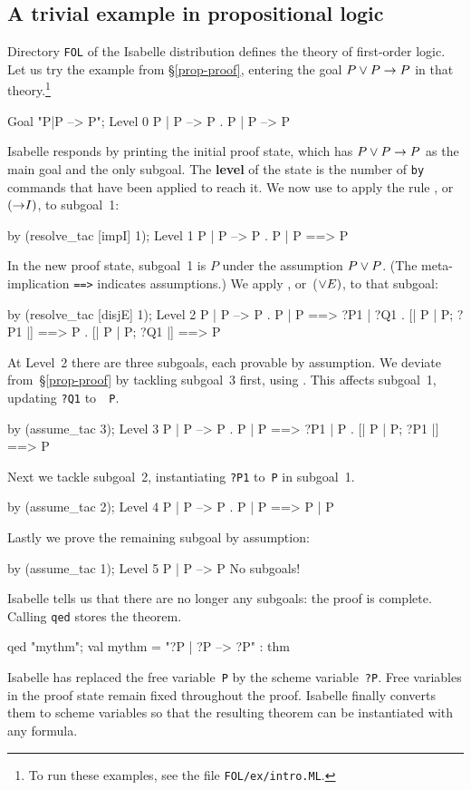 \subsection{A trivial example in propositional logic}

Directory \texttt{FOL} of the Isabelle distribution defines the theory of
first-order logic.  Let us try the example from \S\ref{prop-proof},
entering the goal $P\vee P\rightarrow P$ in that theory.\footnote{To run these
  examples, see the file \texttt{FOL/ex/intro.ML}.}
\begin{ttbox}
Goal "P|P --> P"; 
{\out Level 0} 
{\out P | P --> P} 
{. P | P --> P} 
\end{ttbox}
Isabelle responds by printing the initial proof state, which has $P\vee
P\rightarrow P$ as the main goal and the only subgoal.  The {\bf level} of the
state is the number of \texttt{by} commands that have been applied to reach
it.  We now use  to apply the rule ,
or~$({\rightarrow}I)$, to subgoal~1:
\begin{ttbox}
by (resolve_tac [impI] 1); 
{\out Level 1} 
{\out P | P --> P} 
{. P | P ==> P}
\end{ttbox}
In the new proof state, subgoal~1 is $P$ under the assumption $P\vee P$.
(The meta-implication {\tt==>} indicates assumptions.)  We apply
, or~(${\vee}E)$, to that subgoal:
\begin{ttbox}
by (resolve_tac [disjE] 1); 
{\out Level 2} 
{\out P | P --> P} 
{. P | P ==> ?P1 | ?Q1} 
{. [| P | P; ?P1 |] ==> P} 
{. [| P | P; ?Q1 |] ==> P}
\end{ttbox}
At Level~2 there are three subgoals, each provable by assumption.  We
deviate from~\S\ref{prop-proof} by tackling subgoal~3 first, using
.  This affects subgoal~1, updating {\tt?Q1} to~{\tt
  P}.
\begin{ttbox}
by (assume_tac 3); 
{\out Level 3} 
{\out P | P --> P} 
{. P | P ==> ?P1 | P} 
{. [| P | P; ?P1 |] ==> P}
\end{ttbox}
Next we tackle subgoal~2, instantiating {\tt?P1} to~\texttt{P} in subgoal~1.
\begin{ttbox}
by (assume_tac 2); 
{\out Level 4} 
{\out P | P --> P} 
{. P | P ==> P | P}
\end{ttbox}
Lastly we prove the remaining subgoal by assumption:
\begin{ttbox}
by (assume_tac 1); 
{\out Level 5} 
{\out P | P --> P} 
{\out No subgoals!}
\end{ttbox}
Isabelle tells us that there are no longer any subgoals: the proof is
complete.  Calling \texttt{qed} stores the theorem.
\begin{ttbox}
qed "mythm";
{\out val mythm = "?P | ?P --> ?P" : thm} 
\end{ttbox}
Isabelle has replaced the free variable~\texttt{P} by the scheme
variable~{\tt?P}\@.  Free variables in the proof state remain fixed
throughout the proof.  Isabelle finally converts them to scheme variables
so that the resulting theorem can be instantiated with any formula.


